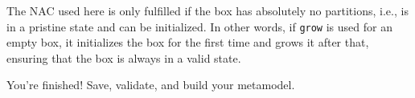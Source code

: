 \begin{stepbystep}
\item The NAC used here is only fulfilled if the box has absolutely no partitions, i.e., is in a pristine state and can be
initialized. In other words, if \texttt{grow} is used for an empty box, it initializes the box for the first time and grows it after that, ensuring that the box
is always in a valid state.
 
\item You're finished! Save, validate, and build your metamodel.

\end{stepbystep}

